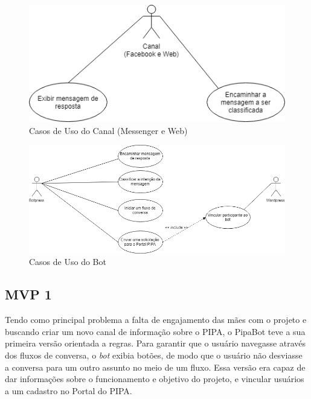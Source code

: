 	\begin{figure}[h!]
		\begin{center}
			\includegraphics[width=12cm]{images/UC_Canal.png}
			\caption{Casos de Uso do Canal (Messenger e Web)}
			\label{fig:uccanal}
		\end{center}
	\end{figure}
	
	\begin{figure}[h!]
		\begin{center}
			\includegraphics[width=1\linewidth]{images/UC_Botpress_Wordpress.png}
			\caption{Casos de Uso do Bot}
			\label{fig:ucbot}
		\end{center}
	\end{figure}
  \FloatBarrier
  \subsection{MVP 1}
  Tendo como principal problema a falta de engajamento das mães com o projeto e buscando criar um novo canal de informação sobre o PIPA, o PipaBot teve a sua primeira versão orientada a regras. Para garantir que o usuário navegasse através dos fluxos de conversa, o \textit{bot} exibia botões, de modo que o usuário não desviasse a conversa para um outro assunto no meio de um fluxo. Essa versão era capaz de dar informações sobre o funcionamento e objetivo do projeto, e vincular usuários a um cadastro no Portal do PIPA.
  
